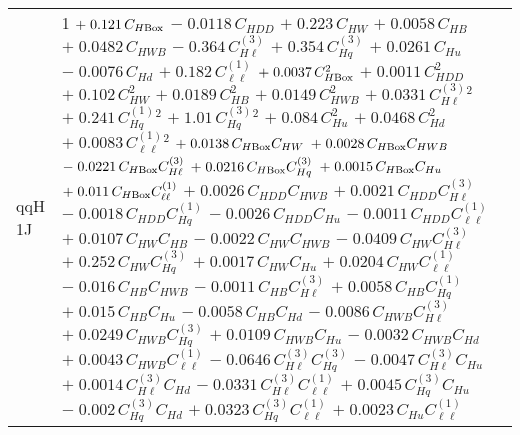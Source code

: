 \begin{tabular}{l|p{}}
    qqH 1J & 1 $+\;0.121\,C_{H\rm{Box}}$ $-\;0.0118\,C_{HDD}$ $+\;0.223\,C_{HW}$ $+\;0.0058\,C_{HB}$ $+\;0.0482\,C_{HWB}$ $-\;0.364\,C^{(3)}_{H\ell}$ $+\;0.354\,C^{(3)}_{Hq}$ $+\;0.0261\,C_{Hu}$ $-\;0.0076\,C_{Hd}$ $+\;0.182\,C^{(1)}_{\ell\ell}$ $+\;0.0037\,C_{H\rm{Box}}^{2}$ $+\;0.0011\,C_{HDD}^{2}$ $+\;0.102\,C_{HW}^{2}$ $+\;0.0189\,C_{HB}^{2}$ $+\;0.0149\,C_{HWB}^{2}$ $+\;0.0331\,C^{(3)}_{H\ell}^{2}$ $+\;0.241\,C^{(1)}_{Hq}^{2}$ $+\;1.01\,C^{(3)}_{Hq}^{2}$ $+\;0.084\,C_{Hu}^{2}$ $+\;0.0468\,C_{Hd}^{2}$ $+\;0.0083\,C^{(1)}_{\ell\ell}^{2}$ $+\;0.0138\,C_{H\rm{Box}}C_{HW}$ $+\;0.0028\,C_{H\rm{Box}}C_{HWB}$ $-\;0.0221\,C_{H\rm{Box}}C^{(3)}_{H\ell}$ $+\;0.0216\,C_{H\rm{Box}}C^{(3)}_{Hq}$ $+\;0.0015\,C_{H\rm{Box}}C_{Hu}$ $+\;0.011\,C_{H\rm{Box}}C^{(1)}_{\ell\ell}$ $+\;0.0026\,C_{HDD}C_{HWB}$ $+\;0.0021\,C_{HDD}C^{(3)}_{H\ell}$ $-\;0.0018\,C_{HDD}C^{(1)}_{Hq}$ $-\;0.0026\,C_{HDD}C_{Hu}$ $-\;0.0011\,C_{HDD}C^{(1)}_{\ell\ell}$ $+\;0.0107\,C_{HW}C_{HB}$ $-\;0.0022\,C_{HW}C_{HWB}$ $-\;0.0409\,C_{HW}C^{(3)}_{H\ell}$ $+\;0.252\,C_{HW}C^{(3)}_{Hq}$ $+\;0.0017\,C_{HW}C_{Hu}$ $+\;0.0204\,C_{HW}C^{(1)}_{\ell\ell}$ $-\;0.016\,C_{HB}C_{HWB}$ $-\;0.0011\,C_{HB}C^{(3)}_{H\ell}$ $+\;0.0058\,C_{HB}C^{(1)}_{Hq}$ $+\;0.015\,C_{HB}C_{Hu}$ $-\;0.0058\,C_{HB}C_{Hd}$ $-\;0.0086\,C_{HWB}C^{(3)}_{H\ell}$ $+\;0.0249\,C_{HWB}C^{(3)}_{Hq}$ $+\;0.0109\,C_{HWB}C_{Hu}$ $-\;0.0032\,C_{HWB}C_{Hd}$ $+\;0.0043\,C_{HWB}C^{(1)}_{\ell\ell}$ $-\;0.0646\,C^{(3)}_{H\ell}C^{(3)}_{Hq}$ $-\;0.0047\,C^{(3)}_{H\ell}C_{Hu}$ $+\;0.0014\,C^{(3)}_{H\ell}C_{Hd}$ $-\;0.0331\,C^{(3)}_{H\ell}C^{(1)}_{\ell\ell}$ $+\;0.0045\,C^{(3)}_{Hq}C_{Hu}$ $-\;0.002\,C^{(3)}_{Hq}C_{Hd}$ $+\;0.0323\,C^{(3)}_{Hq}C^{(1)}_{\ell\ell}$ $+\;0.0023\,C_{Hu}C^{(1)}_{\ell\ell}$ \\

\end{tabular}
